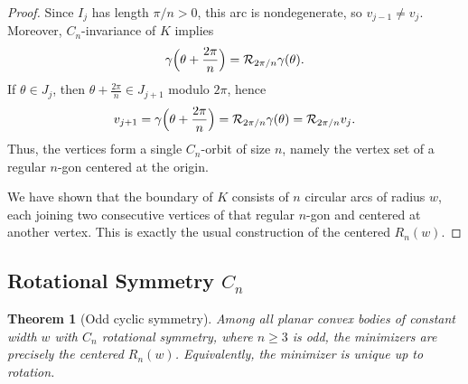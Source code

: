 \documentclass[11pt,letterpaper,reqno]{amsart}
\newtheorem{theorem}{Theorem}[section]
\begin{document}
\begin{proof}
Since $I_j$ has length $\pi/n>0$, this arc is nondegenerate, so $v_{j-1}\neq v_j$. Moreover, $C_n$-invariance of $K$ implies
\[
\gamma\Bigl(\theta+\frac{2\pi}{n}\Bigr)=\mathcal R_{2\pi/n}\gamma(\theta).
\]
If $\theta\in J_j$, then $\theta+\frac{2\pi}{n}\in J_{j+1}$ modulo $2\pi$, hence
\[
v_{j+1}=\gamma\Bigl(\theta+\frac{2\pi}{n}\Bigr)=\mathcal  R_{2\pi/n}\gamma(\theta)=\mathcal R_{2\pi/n}v_j.
\]
Thus, the vertices form a single $C_n$-orbit of size $n$, namely the vertex set of a regular $n$-gon centered at the origin.

We have shown that the boundary of $K$ consists of $n$ circular arcs of radius $w$, each joining two consecutive vertices of that regular $n$-gon and centered at another vertex. This is exactly the usual construction of the centered $R_n(w)$.
\end{proof}


\subsection{Rotational  Symmetry \texorpdfstring{$C_n$}{Cn}}

\begin{theorem}[Odd cyclic symmetry]
\label{thm:cyclic-odd}
Among all planar convex bodies of constant width $w$ with $C_n$ rotational symmetry, where $n\ge3$ is odd, the minimizers are precisely the centered $R_n(w)$. Equivalently, the minimizer is unique up to rotation.
\end{theorem}
\end{document}
